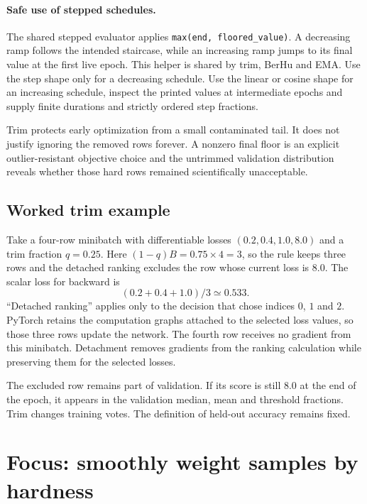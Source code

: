 \documentclass[10pt,aps,prd,twocolumn,nofootinbib]{revtex4-2}
\newcommand{\code}[1]{\texttt{#1}}
\begin{document}
\paragraph{Safe use of stepped schedules.}
The shared stepped evaluator applies \code{max(end, floored\_value)}.  A
decreasing ramp follows the intended staircase, while an increasing ramp jumps
to its final value at the first live epoch.  This helper is shared by trim,
BerHu and EMA.  Use the step shape only for a decreasing schedule.  Use the
linear or cosine shape for an increasing schedule, inspect the printed values
at intermediate epochs and supply finite durations and strictly ordered step
fractions.

Trim protects early optimization from a small contaminated tail.  It does not
justify ignoring the removed rows forever.  A nonzero final floor is an
explicit outlier-resistant objective choice and the untrimmed validation distribution
reveals whether those hard rows remained scientifically unacceptable.

\subsection*{Worked trim example}

Take a four-row minibatch with differentiable losses
$(0.2,0.4,1.0,8.0)$ and a trim fraction $q=0.25$.  Here
$(1-q)B=0.75\times4=3$, so the rule keeps three rows and the detached ranking
excludes the row whose current
loss is $8.0$.  The scalar loss for backward is
\begin{equation*}
  (0.2+0.4+1.0)/3\simeq0.533.
\end{equation*}
``Detached ranking'' applies only to the decision that chose indices $0$, $1$
and $2$.  PyTorch retains the computation graphs attached to the selected loss values, so those three
rows update the network.  The fourth row receives no gradient from this
minibatch.  Detachment removes gradients from the ranking calculation while
preserving them for the selected losses.

The excluded row remains part of validation.  If its score is still $8.0$ at
the end of the epoch, it appears in the validation median, mean and threshold
fractions.  Trim changes training votes.  The definition of held-out accuracy
remains fixed.

\section{Focus: smoothly weight samples by hardness}
\label{sec:focus}
\end{document}
